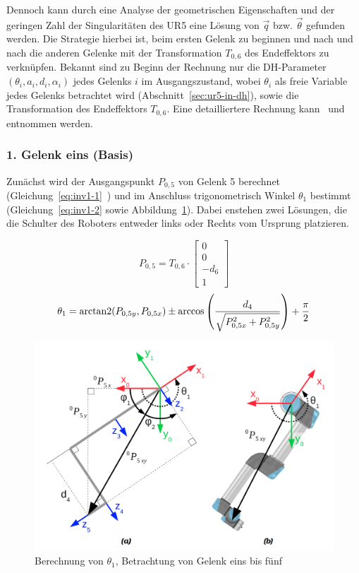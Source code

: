 Dennoch kann durch eine Analyse der geometrischen Eigenschaften und der geringen Zahl der Singularitäten des UR5 eine Lösung von $\overrightarrow{q}$ bzw. $\overrightarrow{\theta}$ gefunden werden.
Die Strategie hierbei ist, beim ersten Gelenk zu beginnen und nach und nach die anderen Gelenke mit der Transformation $T_{0,6}$ des Endeffektors zu verknüpfen.
Bekannt sind zu Beginn der Rechnung nur die DH-Parameter $(\theta_i, a_i, d_i, \alpha_i)$ jedes Gelenks $i$ im Ausgangszustand, wobei $\theta_i$ als freie Variable jedes Gelenks betrachtet wird (Abschnitt~\ref{sec:ur5-in-dh}), sowie die Transformation des Endeffektors $T_{0,6}$.
Eine detailliertere Rechnung kann~\cite{rasmusandersenKinematicsUR52018} und~\cite{hawkinsAnalyticInverseKinematics2013} entnommen werden.

\subsubsection{1. Gelenk eins (Basis)}

Zunächst wird der Ausgangspunkt $P_{0,5}$ von Gelenk 5 berechnet (Gleichung~\ref{eq:inv1-1}~\cite[4]{rasmusandersenKinematicsUR52018}) und im Anschluss trigonometrisch Winkel $\theta_1$ bestimmt (Gleichung~\ref{eq:inv1-2} sowie Abbildung~\ref{fig:inv1-1}).
Dabei enstehen zwei Lösungen, die die Schulter des Roboters entweder links oder Rechts vom Ursprung platzieren.

\begin{equation}
    P_{0,5} = T_{0,6} \cdot
    \begin{bmatrix}
        0 \\ 0 \\ -d_6 \\ 1
    \end{bmatrix}
    \label{eq:inv1-1}
\end{equation}
\begin{equation}
    \theta_1 = \operatorname{arctan2}(P_{0,5y}, P_{0,5x}) \pm \arccos \left( \frac{d_4}{ \sqrt{ P_{0,5x}^2 + P_{0,5y}^2 }  } \right) + \frac{\pi}{2}
    \label{eq:inv1-2}
\end{equation}
\begin{figure}[h]
    \centering
    \includegraphics[width = .5\textwidth]{Bilder/inv1}
    \caption{Berechnung von $\theta_1$, Betrachtung von Gelenk eins bis fünf~\cite{rasmusandersenKinematicsUR52018}}\label{fig:inv1-1}
\end{figure}

